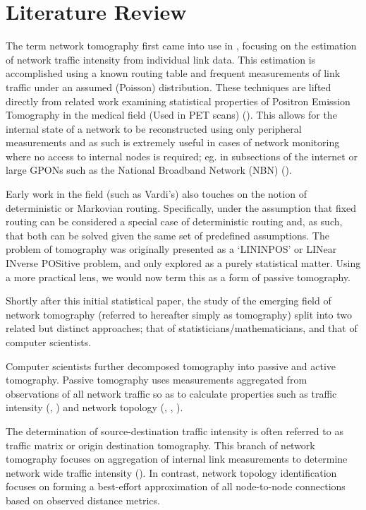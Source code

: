 \chapter{Literature Review}
\label{cha:litreview}

The term network tomography first came into use in \cite{vardi_network_1996}, focusing on the estimation of network traffic intensity from individual link data. This estimation is accomplished using a known routing table and frequent measurements of link traffic under an assumed (Poisson) distribution. These techniques are lifted directly from related work examining statistical properties of Positron Emission Tomography in the medical field (Used in PET scans) (\cite{vardi_statistical_1985}). This allows for the internal state of a network to be reconstructed using only peripheral measurements and as such is extremely useful in cases of network monitoring where no access to internal nodes is required; eg. in subsections of the internet or large GPONs such as the National Broadband Network (NBN) (\cite{gregory_how_2019}).\par
Early work in the field (such as Vardi’s) also touches on the notion of deterministic or Markovian routing. Specifically, under the assumption that fixed routing can be considered a special case of deterministic routing and, as such, that both can be solved given the same set of predefined assumptions. The problem of tomography was originally presented as a ‘LININPOS’ or LINear INverse POSitive problem, and only explored as a purely statistical matter. Using a more practical lens, we would now term this as a form of passive tomography.\par
Shortly after this initial statistical paper, the study of the emerging field of network tomography (referred to hereafter simply as tomography) split into two related but distinct approaches; that of statisticians/mathematicians, and that of computer scientists.\par
Computer scientists further decomposed tomography into passive and active tomography. Passive tomography uses measurements aggregated from observations of all network traffic so as to calculate properties such as traffic intensity (\cite{vardi_network_1996}, \cite{coates_network_2001}) and network topology (\cite{hailiang_network_2009}, \cite{zhang_topology_2014}, \cite{hailiang_network_2009}).\par
The determination of source-destination traffic intensity is often referred to as traffic matrix or origin destination tomography. This branch of network tomography focuses on aggregation of internal link measurements to determine network wide traffic intensity (\cite{cao_time-varying_2000}). In contrast, network topology identification focuses on forming a best-effort approximation of all node-to-node connections based on observed distance metrics.\par
